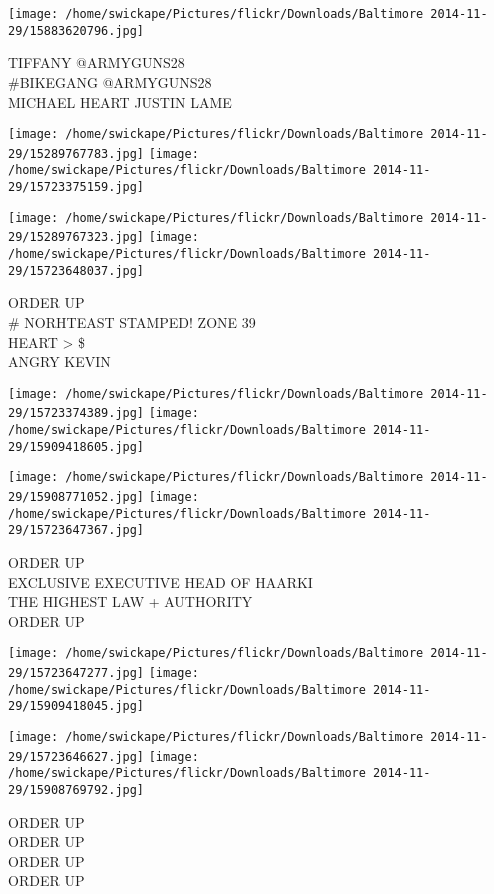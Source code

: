\documentclass[10pt,letterpaper]{article}
\begin{document}
\vspace{0.25in}
\texttt{[image: /home/swickape/Pictures/flickr/Downloads/Baltimore 2014-11-29/15883620796.jpg]}

TIFFANY @ARMYGUNS28\\
\#BIKEGANG @ARMYGUNS28\\
MICHAEL HEART JUSTIN LAME
\pagebreak

\texttt{[image: /home/swickape/Pictures/flickr/Downloads/Baltimore 2014-11-29/15289767783.jpg]}
\texttt{[image: /home/swickape/Pictures/flickr/Downloads/Baltimore 2014-11-29/15723375159.jpg]}

\texttt{[image: /home/swickape/Pictures/flickr/Downloads/Baltimore 2014-11-29/15289767323.jpg]}
\texttt{[image: /home/swickape/Pictures/flickr/Downloads/Baltimore 2014-11-29/15723648037.jpg]}

ORDER UP\\
\# NORHTEAST STAMPED! ZONE 39\\
HEART > \$\\
ANGRY KEVIN
\pagebreak

\texttt{[image: /home/swickape/Pictures/flickr/Downloads/Baltimore 2014-11-29/15723374389.jpg]}
\texttt{[image: /home/swickape/Pictures/flickr/Downloads/Baltimore 2014-11-29/15909418605.jpg]}

\texttt{[image: /home/swickape/Pictures/flickr/Downloads/Baltimore 2014-11-29/15908771052.jpg]}
\texttt{[image: /home/swickape/Pictures/flickr/Downloads/Baltimore 2014-11-29/15723647367.jpg]}

ORDER UP\\
EXCLUSIVE EXECUTIVE HEAD OF HAARKI\\
THE HIGHEST LAW + AUTHORITY\\
ORDER UP
\pagebreak

\texttt{[image: /home/swickape/Pictures/flickr/Downloads/Baltimore 2014-11-29/15723647277.jpg]}
\texttt{[image: /home/swickape/Pictures/flickr/Downloads/Baltimore 2014-11-29/15909418045.jpg]}

\texttt{[image: /home/swickape/Pictures/flickr/Downloads/Baltimore 2014-11-29/15723646627.jpg]}
\texttt{[image: /home/swickape/Pictures/flickr/Downloads/Baltimore 2014-11-29/15908769792.jpg]}

ORDER UP\\
ORDER UP\\
ORDER UP\\
ORDER UP
\pagebreak
\end{document}
